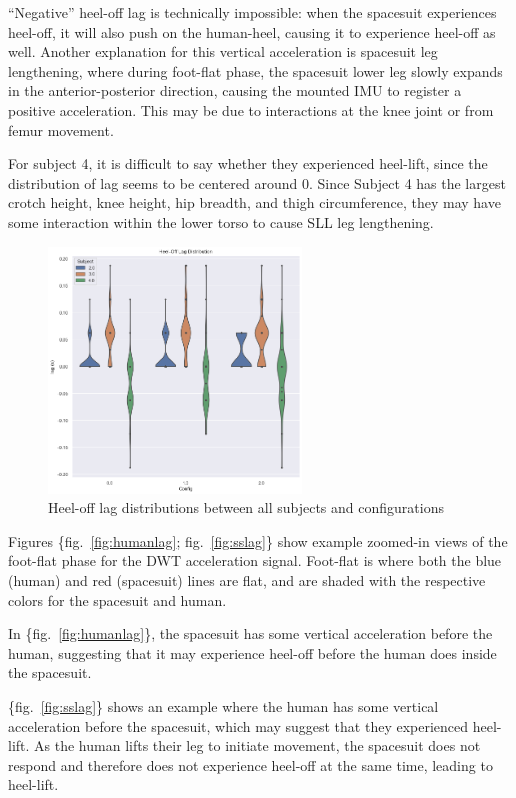 \documentclass[defaultstyle,11pt]{comps}
\begin{document}
``Negative'' heel-off lag is technically impossible: when the spacesuit experiences heel-off, it will also push on the human-heel, causing it to experience heel-off as well.
Another explanation for this vertical acceleration is spacesuit leg lengthening, where during foot-flat phase, the spacesuit lower leg slowly expands in the anterior-posterior direction, causing the mounted IMU to register a positive acceleration.
This may be due to interactions at the knee joint or from femur movement.

For subject 4, it is difficult to say whether they experienced heel-lift, since the distribution of lag seems to be centered around 0. Since Subject 4 has the largest crotch height, knee height, hip breadth, and thigh circumference, they may have some interaction within the lower torso to cause SLL leg lengthening.

\begin{figure}
\hypertarget{fig:heeloffdist}{%
\centering
\includegraphics[width=0.6\textwidth,height=\textheight]{../fig/SA1/heelOffLag.png}
\caption{Heel-off lag distributions between all subjects and configurations}\label{fig:heeloffdist}
}
\end{figure}

Figures \{fig.~\ref{fig:humanlag}; fig.~\ref{fig:sslag}\} show example zoomed-in views of the foot-flat phase for the DWT acceleration signal.
Foot-flat is where both the blue (human) and red (spacesuit) lines are flat, and are shaded with the respective colors for the spacesuit and human.

In \{fig.~\ref{fig:humanlag}\}, the spacesuit has some vertical acceleration before the human, suggesting that it may experience heel-off before the human does inside the spacesuit.

\{fig.~\ref{fig:sslag}\} shows an example where the human has some vertical acceleration before the spacesuit, which may suggest that they experienced heel-lift.
As the human lifts their leg to initiate movement, the spacesuit does not respond and therefore does not experience heel-off at the same time, leading to heel-lift.
\end{document}
